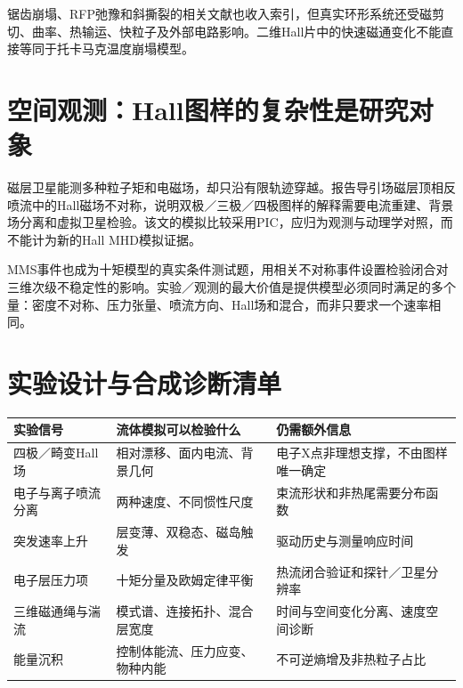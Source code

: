 锯齿崩塌、RFP弛豫和斜撕裂的相关文献也收入索引，但真实环形系统还受磁剪切、曲率、热输运、快粒子及外部电路影响。二维Hall片中的快速磁通变化不能直接等同于托卡马克温度崩塌模型。\citep{Ottaviani1993}

\section{空间观测：Hall图样的复杂性是研究对象}
磁层卫星能测多种粒子矩和电磁场，却只沿有限轨迹穿越。\citet{Teh2026}报告导引场磁层顶相反喷流中的Hall磁场不对称，说明双极／三极／四极图样的解释需要电流重建、背景场分离和虚拟卫星检验。该文的模拟比较采用PIC，应归为观测与动理学对照，而不能计为新的Hall MHD模拟证据。

MMS事件也成为十矩模型的真实条件测试题，\citet{Closure2026}用相关不对称事件设置检验闭合对三维次级不稳定性的影响。实验／观测的最大价值是提供模型必须同时满足的多个量：密度不对称、压力张量、喷流方向、Hall场和混合，而非只要求一个速率相同。

\section{实验设计与合成诊断清单}
\begin{longtable}{P{34mm}P{58mm}P{60mm}}
\toprule 实验信号 & 流体模拟可以检验什么 & 仍需额外信息\\\midrule
四极／畸变Hall场 & 相对漂移、面内电流、背景几何 & 电子X点非理想支撑，不由图样唯一确定\\
电子与离子喷流分离 & 两种速度、不同惯性尺度 & 束流形状和非热尾需要分布函数\\
突发速率上升 & 层变薄、双稳态、磁岛触发 & 驱动历史与测量响应时间\\
电子层压力项 & 十矩分量及欧姆定律平衡 & 热流闭合验证和探针／卫星分辨率\\
三维磁通绳与湍流 & 模式谱、连接拓扑、混合层宽度 & 时间与空间变化分离、速度空间诊断\\
能量沉积 & 控制体能流、压力应变、物种内能 & 不可逆熵增及非热粒子占比\\\bottomrule
\end{longtable}
